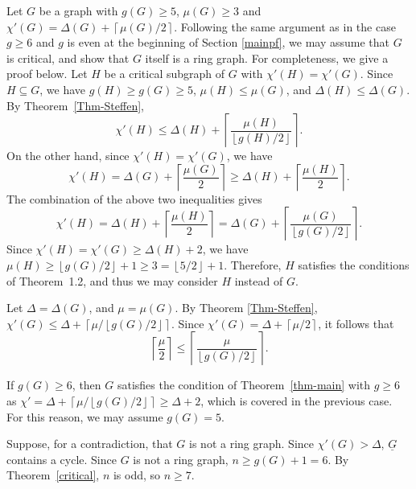 \documentclass[12pt,oneside]{amsart}
\newcommand\roundup[1]{\left\lceil#1\right\rceil}
\newcommand\rounddown[1]{\left\lfloor#1\right\rfloor}
\begin{document}
Let $G$ be a graph with $g(G) \ge 5$, $\mu(G) \ge 3$ and $\chi'(G) =\Delta(G) + \roundup{\mu(G)/2}$.
Following the same argument as in the case $g\ge 6$ and $g$ is even at the beginning of Section \ref{mainpf}, we may assume that $G$ is critical, and show that $G$ itself is a ring graph. For completeness, we give a proof below. Let $H$ be a critical subgraph of $G$ with $\chi'(H) =\chi'(G)$.  Since $H\subseteq G$, we have $g(H) \ge g(G) \ge 5$, $\mu(H) \le \mu(G)$, and $\Delta(H) \le \Delta(G)$.
By Theorem~\ref{Thm-Steffen},
$$
\chi'(H) \le \Delta(H) + \roundup{\frac{\mu(H)}{\rounddown{g(H)/2}}}.
$$
On the other hand, since $\chi'(H) =\chi'(G)$, we have
$$\chi'(H)  =\Delta(G) +\roundup{\frac{\mu(G)}{2}} \ge \Delta(H) + \roundup{\frac{\mu(H)}{2}}.
$$
The combination of the above two inequalities gives   $$
\chi'(H)=\Delta(H) + \roundup{\frac{\mu(H)}2} = \Delta(G) + \roundup{\frac{\mu(G)}{\rounddown{g(G)/2}}}.
$$
Since $\chi'(H) = \chi'(G) \ge \Delta(H) +2$, we have $\mu(H) \ge \rounddown{g(G)/2} +1\ge 3 =\rounddown{5/2} +1$. Therefore, $H$ satisfies the conditions of Theorem~1.2, and thus we may consider  $H$ instead of $G$.

Let $\Delta =\Delta(G)$, and $\mu=\mu(G)$. By Theorem \ref{Thm-Steffen},  $\chi'(G)\le \Delta+\roundup{\mu/\rounddown{g(G)/2}}$. Since $\chi'(G) = \Delta + \roundup{\mu/2}$, it follows that
\begin{equation}\label{eq:inequality0}
\roundup{\frac{\mu}{2}}\le \roundup{\frac{\mu}{\rounddown{ g(G)/2}}}.
\end{equation}


If $g(G) \ge 6$, then $G$ satisfies the condition of Theorem~\ref{thm-main} with $g\ge 6$ as $\chi' =\Delta +\roundup{\mu/\rounddown{g(G)/2}} \ge \Delta +2$, which is covered in the previous case. For this reason, we may assume $g(G) =5$.

Suppose, for a contradiction, that $G$ is not a ring graph.
Since $\chi'(G) > \Delta$, $\underline{G}$ contains a cycle. Since $G$ is not a ring graph, $n\ge g(G) +1=6$. By Theorem~\ref{critical}, $n$ is odd, so $n \ge 7$.
\end{document}
